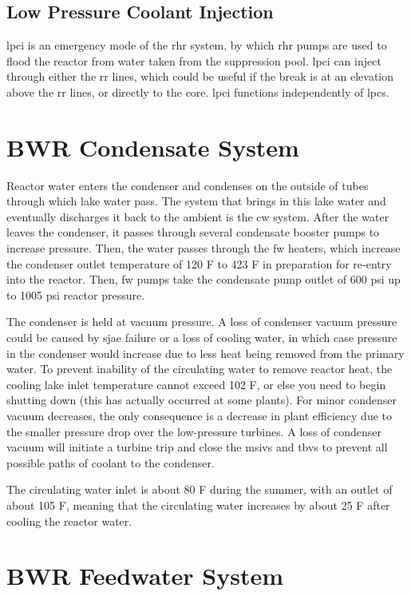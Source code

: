\documentclass[10pt]{article}
\begin{document}
\subsection{Low Pressure Coolant Injection}
\gls{lpci} is an emergency mode of the \gls{rhr} system, by which \gls{rhr} pumps are used to flood the reactor from water taken from the suppression pool. \gls{lpci} can inject through either the \gls{rr} lines, which could be useful if the break is at an elevation above the \gls{rr} lines, or directly to the core. \gls{lpci} functions independently of \gls{lpcs}. 




\section{BWR Condensate System}

Reactor water enters the condenser and condenses on the outside of tubes through which lake water pass. The system that brings in this lake water and eventually discharges it back to the ambient is the \gls{cw} system. After the water leaves the condenser, it passes through several condensate booster pumps to increase pressure. Then, the water passes through the \gls{fw} heaters, which increase the condenser outlet temperature of 120 F to 423 F in preparation for re-entry into the reactor. Then, \gls{fw} pumps take the condensate pump outlet of 600 psi up to 1005 psi reactor pressure. 

The condenser is held at vacuum pressure. A loss of condenser vacuum pressure could be caused by \gls{sjae} failure or a loss of cooling water, in which case pressure in the condenser would increase due to less heat being removed from the primary water. To prevent inability of the circulating water to remove reactor heat, the cooling lake inlet temperature cannot exceed 102 F, or else you need to begin shutting down (this has actually occurred at some plants). For minor condenser vacuum decreases, the only consequence is a decrease in plant efficiency due to the smaller pressure drop over the low-pressure turbines. A loss of condenser vacuum will initiate a turbine trip and close the \gls{msiv}s and \gls{tbv}s to prevent all possible paths of coolant to the condenser. 

The circulating water inlet is about 80 F during the summer, with an outlet of about 105 F, meaning that the circulating water increases by about 25 F after cooling the reactor water. 

\section{BWR Feedwater System}
\end{document}
